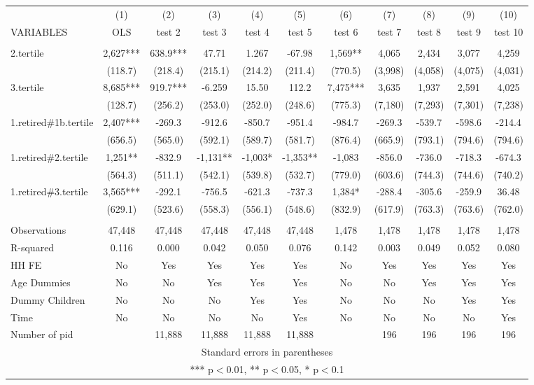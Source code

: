 \begin{tabular}{lcccccccccc} \hline
 & (1) & (2) & (3) & (4) & (5) & (6) & (7) & (8) & (9) & (10) \\
VARIABLES & OLS & test 2 & test 3 & test 4 & test 5 & test 6 & test 7 & test 8 & test 9 & test 10 \\ \hline
 &  &  &  &  &  &  &  &  &  &  \\
2.tertile & 2,627*** & 638.9*** & 47.71 & 1.267 & -67.98 & 1,569** & 4,065 & 2,434 & 3,077 & 4,259 \\
 & (118.7) & (218.4) & (215.1) & (214.2) & (211.4) & (770.5) & (3,998) & (4,058) & (4,075) & (4,031) \\
3.tertile & 8,685*** & 919.7*** & -6.259 & 15.50 & 112.2 & 7,475*** & 3,635 & 1,937 & 2,591 & 4,025 \\
 & (128.7) & (256.2) & (253.0) & (252.0) & (248.6) & (775.3) & (7,180) & (7,293) & (7,301) & (7,238) \\
1.retired\#1b.tertile & 2,407*** & -269.3 & -912.6 & -850.7 & -951.4 & -984.7 & -269.3 & -539.7 & -598.6 & -214.4 \\
 & (656.5) & (565.0) & (592.1) & (589.7) & (581.7) & (876.4) & (665.9) & (793.1) & (794.6) & (794.6) \\
1.retired\#2.tertile & 1,251** & -832.9 & -1,131** & -1,003* & -1,353** & -1,083 & -856.0 & -736.0 & -718.3 & -674.3 \\
 & (564.3) & (511.1) & (542.1) & (539.8) & (532.7) & (779.0) & (603.6) & (744.3) & (744.6) & (740.2) \\
1.retired\#3.tertile & 3,565*** & -292.1 & -756.5 & -621.3 & -737.3 & 1,384* & -288.4 & -305.6 & -259.9 & 36.48 \\
 & (629.1) & (523.6) & (558.3) & (556.1) & (548.6) & (832.9) & (617.9) & (763.3) & (763.6) & (762.0) \\
 &  &  &  &  &  &  &  &  &  &  \\
Observations & 47,448 & 47,448 & 47,448 & 47,448 & 47,448 & 1,478 & 1,478 & 1,478 & 1,478 & 1,478 \\
R-squared & 0.116 & 0.000 & 0.042 & 0.050 & 0.076 & 0.142 & 0.003 & 0.049 & 0.052 & 0.080 \\
HH FE & No & Yes & Yes & Yes & Yes & No & Yes & Yes & Yes & Yes \\
Age Dummies & No & No & Yes & Yes & Yes & No & No & Yes & Yes & Yes \\
Dummy Children & No & No & No & Yes & Yes & No & No & No & Yes & Yes \\
Time & No & No & No & No & Yes & No & No & No & No & Yes \\
 Number of pid &  & 11,888 & 11,888 & 11,888 & 11,888 &  & 196 & 196 & 196 & 196 \\ \hline
\multicolumn{11}{c}{ Standard errors in parentheses} \\
\multicolumn{11}{c}{ *** p$<$0.01, ** p$<$0.05, * p$<$0.1} \\
\end{tabular}
